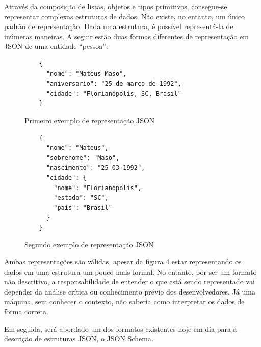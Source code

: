 \begin{table}[H]
  \centering
  \caption{Tipos de valores em JSON}
\end{table}

Através da composição de listas, objetos e tipos primitivos, consegue-se representar complexas estruturas de dados. Não existe, no entanto, um único padrão de representação. Dada uma estrutura, é possível representá-la de inúmeras maneiras. A seguir estão duas formas diferentes de representação em JSON de uma entidade “pessoa”:
 \cite{Droettboom2015}

\begin{figure}[H]
  \centering
  \begin{verbatim}
    {
      "nome": "Mateus Maso",
      "aniversario": "25 de março de 1992",
      "cidade": "Florianópolis, SC, Brasil"
    }
  \end{verbatim}
  \caption{Primeiro exemplo de representação JSON}
\end{figure}

\begin{figure}[H]
  \centering
  \begin{verbatim}
    {
      "nome": "Mateus",
      "sobrenome": "Maso",
      "nascimento": "25-03-1992",
      "cidade": {
        "nome": "Florianópolis",
        "estado": "SC",
        "pais": "Brasil"
      }
    }
  \end{verbatim}
  \caption{Segundo exemplo de representação JSON}
\end{figure}

Ambas representações são válidas, apesar da figura 4 estar representando os dados em uma estrutura um pouco mais formal. No entanto, por ser um formato não descritivo, a responsabilidade de entender o que está sendo representado vai depender da análise crítica ou conhecimento prévio dos desenvolvedores. Já uma máquina, sem conhecer o contexto, não saberia como interpretar os dados de forma correta. \cite{Droettboom2015}

Em seguida, será abordado um dos formatos existentes hoje em dia para a descrição de estruturas JSON, o JSON Schema.


